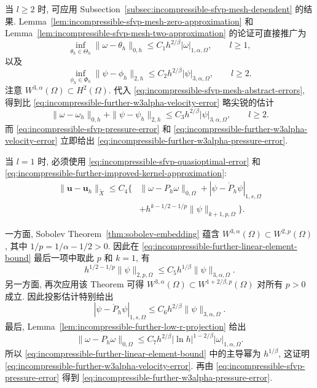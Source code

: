 \begin{Proof}
当 $l\geq2$ 时, 可应用 Subsection~\ref{subsec:incompressible-sfvp-mesh-dependent}
的结果. Lemma~\ref{lem:incompressible-sfvp-mesh-zero-approximation}
和 Lemma~\ref{lem:incompressible-sfvp-mesh-two-approximation}
的论证可直接推广为
\[
\inf_{\theta_h\in\Theta_h}\|\omega-\theta_h\|_{0,h}
\leq C_1h^{2/\beta}|\omega|_{1,\alpha,\Omega},
\qquad l\geq1,
\]
以及
\[
\inf_{\phi_h\in\Phi_h}\|\psi-\phi_h\|_{2,h}
\leq C_2h^{2/\beta}|\psi|_{3,\alpha,\Omega},
\qquad l\geq2.
\]
注意 $W^{3,\alpha}(\Omega)\subset H^2(\Omega)$.
代入 \eqref{eq:incompressible-sfvp-mesh-abstract-errors},
得到比 \eqref{eq:incompressible-further-w3alpha-velocity-error}
略尖锐的估计
\begin{equation}\label{eq:incompressible-further-mesh-w3alpha-error}
\|\omega-\omega_h\|_{0,h}
+\|\psi-\psi_h\|_{2,h}
\leq C_3h^{2/\beta}|\psi|_{3,\alpha,\Omega},
\qquad l\geq2.
\end{equation}
而 \eqref{eq:incompressible-sfvp-pressure-error}
和 \eqref{eq:incompressible-further-w3alpha-velocity-error}
立即给出 \eqref{eq:incompressible-further-w3alpha-pressure-error}.

当 $l=1$ 时, 必须使用
\eqref{eq:incompressible-sfvp-quasioptimal-error}
和 \eqref{eq:incompressible-further-improved-kernel-approximation}:
\begin{equation}\label{eq:incompressible-further-linear-element-bound}
\begin{split}
\|\mathbf u-\mathbf u_h\|_{\widetilde X}
\leq C_4\bigl\{&\|\omega-P_h\omega\|_{0,\Omega}
+|\psi-\mathring P_h\psi|_{1,s,\Omega}\\
&+h^{k-1/2-1/p}\|\psi\|_{k+1,p,\Omega}\bigr\}.
\end{split}
\end{equation}

一方面, Sobolev Theorem~\ref{thm:sobolev-embedding}
蕴含 $W^{3,\alpha}(\Omega)\subset W^{2,p}(\Omega)$,
其中 $1/p=1/\alpha-1/2>0$.
因此在 \eqref{eq:incompressible-further-linear-element-bound}
最后一项中取此 $p$ 和 $k=1$, 有
\[
h^{1/2-1/p}\|\psi\|_{2,p,\Omega}
\leq C_5h^{1/\beta}\|\psi\|_{3,\alpha,\Omega}.
\]
另一方面, 再次应用该 Theorem 可得
$W^{3,\alpha}(\Omega)\subset W^{1+2/\beta,p}(\Omega)$
对所有 $p>0$ 成立. 因此投影估计特别给出
\[
|\psi-\mathring P_h\psi|_{1,s,\Omega}
\leq C_6h^{2/\beta}\|\psi\|_{3,\alpha,\Omega}.
\]
最后, Lemma~\ref{lem:incompressible-further-low-r-projection} 给出
\[
\|\omega-P_h\omega\|_{0,\Omega}
\leq C_7h^{2/\beta}|\ln h|^{1-2/\beta}
|\omega|_{1,\alpha,\Omega}.
\]
所以 \eqref{eq:incompressible-further-linear-element-bound}
中的主导幂为 $h^{1/\beta}$,
这证明 \eqref{eq:incompressible-further-w3alpha-velocity-error}.
再由 \eqref{eq:incompressible-sfvp-pressure-error}
得到 \eqref{eq:incompressible-further-w3alpha-pressure-error}.
\end{Proof}

